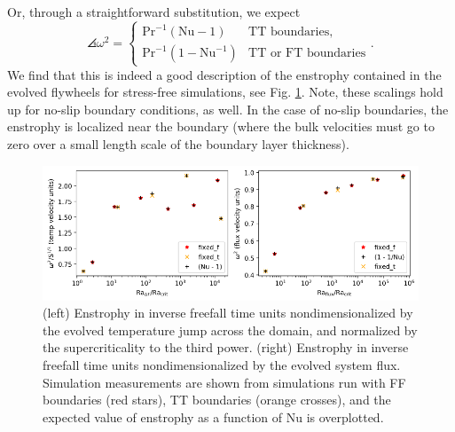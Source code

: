 Or, through a straightforward substitution, we expect
\begin{equation}
\angles{\omega^2} = 
\begin{cases}
\text{Pr}^{-1} (\text{Nu} - 1)  & \text{TT boundaries}, \\
\text{Pr}^{-1} (1 - \text{Nu}^{-1}) & \text{TT or FT boundaries}
\end{cases}.
\end{equation}
We find that this is indeed a good description of the enstrophy contained in the evolved flywheels for stress-free simulations, see Fig. \ref{fig:enstrophy}.
Note, these scalings hold up for no-slip boundary conditions, as well.
In the case of no-slip boundaries, the enstrophy is localized near the boundary (where the bulk velocities must go to zero over a small length scale of the boundary layer thickness).

\begin{figure}[t!]
    \includegraphics[width=\textwidth]{figs/unpublished/enstrophy_v_ra.pdf}
    \caption[Evolved enstrophy in RBC simulations.]{
	(left) Enstrophy in inverse freefall time units nondimensionalized by the evolved temperature jump across the domain, and normalized by the supercriticality to the third power.
	(right) Enstrophy in inverse freefall time units nondimensionalized by the evolved system flux.
	Simulation measurements are shown from simulations run with FF boundaries (red stars), TT boundaries (orange crosses), and the expected value of enstrophy as a function of Nu is overplotted.
    \label{fig:enstrophy} }
\end{figure}

